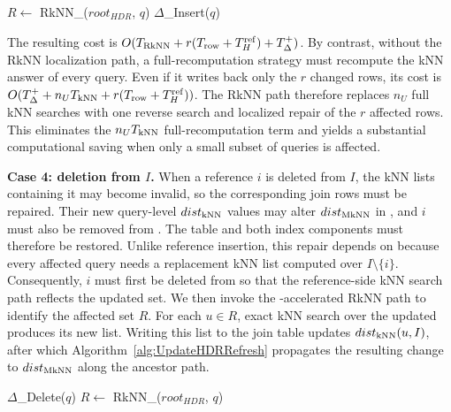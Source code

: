 \begin{algorithm}[t]
\caption{$\knnjoin$\_Insertion\_I($q$)}
\label{alg:UpdateKNN_insert_I}
$R\leftarrow$ RkNN\_\dualtree($root_{HDR}$, $q$)\;
$\Delta$\_Insert($q$)\;
\end{algorithm}

The resulting cost is $O(T_{\operatorname{RkNN}}+r(T_{\mathrm{row}}+T_H^{\mathrm{ref}})+T_{\Delta}^{+})$. By contrast, without the RkNN localization path, a full-recomputation strategy must recompute the kNN answer of every query. Even if it writes back only the $r$ changed rows, its cost is $O(T_{\Delta}^{+}+n_U T_{\operatorname{kNN}}+r(T_{\mathrm{row}}+T_H^{\mathrm{ref}}))$. The RkNN path therefore replaces $n_U$ full kNN searches with one reverse search and localized repair of the $r$ affected rows. This eliminates the $n_U T_{\operatorname{kNN}}$ full-recomputation term and yields a substantial computational saving when only a small subset of queries is affected.

\noindent \textbf{Case 4: deletion from $I$.}
When a reference $i$ is deleted from $I$, the kNN lists containing it may become invalid, so the corresponding join rows must be repaired. Their new query-level $dist_{\operatorname{kNN}}$ values may alter $dist_{\operatorname{MkNN}}$ in \hdrtree, and $i$ must also be removed from \deltatree. The table and both index components must therefore be restored. Unlike reference insertion, this repair depends on \deltatree because every affected query needs a replacement kNN list computed over $I\setminus\{i\}$. Consequently, $i$ must first be deleted from \deltatree so that the reference-side kNN search path reflects the updated set. We then invoke the \hdrtree-accelerated RkNN path to identify the affected set $R$. For each $u\in R$, exact kNN search over the updated \deltatree produces its new list. Writing this list to the join table updates $dist_{\operatorname{kNN}}(u,I)$, after which Algorithm~\ref{alg:UpdateHDRRefresh} propagates the resulting change to $dist_{\operatorname{MkNN}}$ along the ancestor path.

\begin{algorithm}[t]
\caption{$\knnjoin$\_Deletion\_I($q$)}
\label{alg:UpdateKNN_deletion_I}
$\Delta$\_Delete($q$)\;
$R\leftarrow$ RkNN\_\dualtree($root_{HDR}$, $q$)\;
\end{algorithm}


